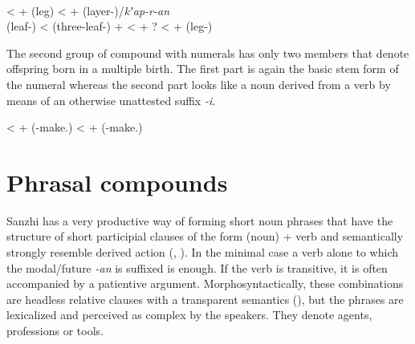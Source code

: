 \begin{exe}
	\ex	\label{ex:CompoundNounsNumeralsNouns} 
	\begin{xlist}
		\TabPositions{2em,4em}
			\ex	{}			\\
			\tab	<	\tab	 {}  +  (leg)										
			\ex	{}			\tab	<	\tab	 {}  +  (layer-)\slash\textit{kʼap-r-an} \\
			(leaf-)
			\ex	{}			\tab	<	\tab	 {} (three-leaf-) +  
			\ex	{}			\tab	<	\tab	{}  + ?	
			\ex	{}			\tab	<	\tab	{}  +  (leg-)						
	\end{xlist}
\end{exe}	

The second group of compound  with numerals has only two members  that denote offspring born in a multiple birth. The first part is again the basic stem form of the numeral whereas the second part looks like a noun derived from a verb by means of an otherwise unattested suffix \textit{-i}.

\begin{exe}
	\ex	\label{ex:CompoundNounsNumerals2} 
	\begin{xlist}
		\TabPositions{9em,11em}					
			\ex	{}			\tab	<	\tab	 {}  +  (\tsc{npl}-make.\tsc{pfv-?}) 
			\ex	{}				\tab	<	\tab	 {}  +  (\tsc{npl}-make.\tsc{pfv-?}) 
	\end{xlist}
\end{exe}	



\section{Phrasal compounds}
\label{ssec:N-genN}
Sanzhi has a very productive way of forming short noun phrases that have the structure of short participial clauses of the form (noun) + verb and semantically strongly resemble derived action  (, ). In the minimal case a verb alone to which the modal/future  \textit{-an} is suffixed is enough. If the verb is transitive, it is often accompanied by a patientive argument. Morphosyntactically, these combinations are headless relative clauses with a transparent semantics (), but the phrases are lexicalized and perceived as complex  by the speakers. They denote agents, professions or tools.

